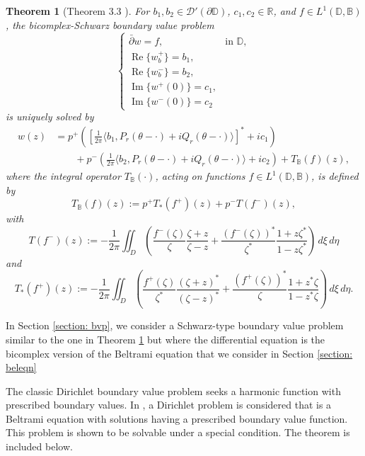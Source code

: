 \documentclass[12pt,reqno]{amsart}
\newtheorem{theorem}{Theorem}[section]
\theoremstyle{definition}
\theoremstyle{remark}
\newcommand{\R}{\mathbb R}
\newcommand{\p}{\partial}
\newcommand{\dbar}{\bar\partial}
\DeclareMathOperator{\im}{Im}
\DeclareMathOperator{\re}{Re}
\newcommand{\bc}{\mathbb{B}}
\newcommand{\disk}{\mathbb{D}}
\begin{document}
    
    \begin{theorem}[Theorem 3.3 \cite{BCSchwarz}]\label{thm: generalbcschwar}
    For $b_1, b_2 \in \mathcal{D}'(\p \disk)$, $c_1, c_2 \in \R$, and $f \in L^1(\disk, \bc)$, the bicomplex-Schwarz boundary value problem 
\[
\begin{cases}
    \dbar w = f, & \text{in } \disk,\\
    \re\{w^+_b\} = b_1, \\
    \re\{w^-_b\} = b_2,\\
    \im\{ w^+(0)\}  = c_1, \\
    \im\{ w^-(0) \} = c_2
\end{cases}
\]
is uniquely solved by 
\begin{align*}
w(z) &= p^+ \left( \left[\frac{1}{2\pi} \langle b_1, P_r(\theta-\cdot) + i Q_r(\theta - \cdot)\rangle\right]^* + ic_1  \right)  \\
&\quad\quad + p^- \left(\frac{1}{2\pi} \langle b_2, P_r(\theta-\cdot) + i Q_r(\theta - \cdot)\rangle +ic_2 \right) +T_\bc(f)(z),
\end{align*}
    where the integral operator $T_\bc(\cdot)$, acting on functions $f \in L^1(\disk,\bc)$, is defined by 
\[
    T_\bc(f)(z):= p^+ T_*(f^+)(z) + p^- T(f^-)(z),
\]
with
\[
T(f^-)(z) := -\frac{1}{2 \pi} \iint_D \left(\frac{f^-(\zeta)}{\zeta} \frac{\zeta+z}{\zeta - z} + \frac{(f^-(\zeta))^*}{\zeta^*} \frac{1+z\zeta^*}{1-z\zeta^*} \right)\,d\xi\,d\eta
\]
and
\[
T_*(f^+)(z) := -\frac{1}{2 \pi} \iint_D \left(\frac{f^+(\zeta)}{\zeta^*} \frac{(\zeta+z)^*}{(\zeta - z)^*} + \frac{(f^+(\zeta))^*}{\zeta} \frac{1+z^*\zeta}{1-z^*\zeta} \right) \,d\xi\,d\eta.
\]
    \end{theorem}

In Section \ref{section: bvp}, we consider a Schwarz-type boundary value problem similar to the one in Theorem \ref{thm: generalbcschwar} but where the differential equation is the bicomplex version of the Beltrami equation that we consider in Section \ref{section: beleqn}

The classic Dirichlet boundary value problem seeks a harmonic function with prescribed boundary values. In \cite{BeltramiSchwarz}, a Dirichlet problem is considered that is a Beltrami equation with solutions having a prescribed boundary value function. This problem is shown to be solvable under a special condition. The theorem is included below.
\end{document}
